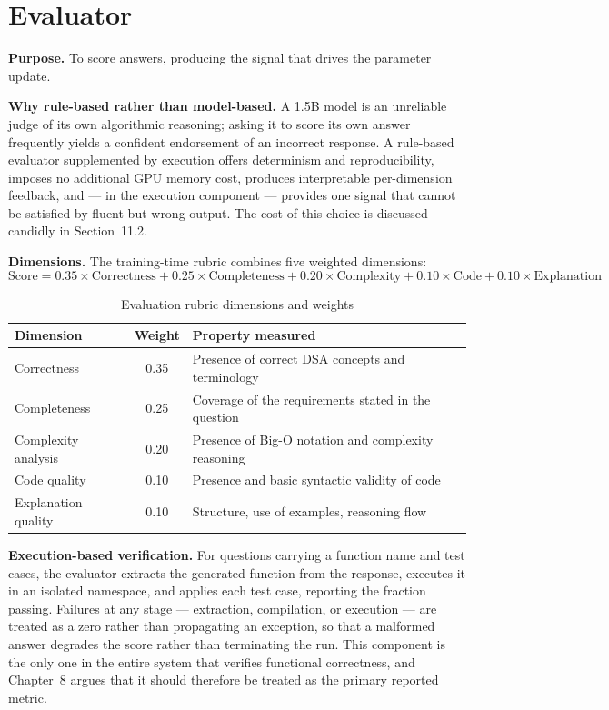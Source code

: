 \documentclass[12pt,a4paper]{report}
\begin{document}
\section{Evaluator}

\textbf{Purpose.} To score answers, producing the signal that drives the parameter update.

\textbf{Why rule-based rather than model-based.} A 1.5B model is an unreliable judge of its own algorithmic reasoning; asking it to score its own answer frequently yields a confident endorsement of an incorrect response. A rule-based evaluator supplemented by execution offers determinism and reproducibility, imposes no additional GPU memory cost, produces interpretable per-dimension feedback, and --- in the execution component --- provides one signal that cannot be satisfied by fluent but wrong output. The cost of this choice is discussed candidly in Section~11.2.

\textbf{Dimensions.} The training-time rubric combines five weighted dimensions:
\begin{equation}
\text{Score} = 0.35 \times \text{Correctness} + 0.25 \times \text{Completeness} + 0.20 \times \text{Complexity} + 0.10 \times \text{Code} + 0.10 \times \text{Explanation}
\end{equation}

\begin{table}[htbp]
\centering
\caption{Evaluation rubric dimensions and weights}
\begin{tabular}{>{\raggedright\arraybackslash}p{3cm} c p{6cm}}
\toprule
\textbf{Dimension} & \textbf{Weight} & \textbf{Property measured} \\
\midrule
Correctness & 0.35 & Presence of correct DSA concepts and terminology \\
Completeness & 0.25 & Coverage of the requirements stated in the question \\
Complexity analysis & 0.20 & Presence of Big-O notation and complexity reasoning \\
Code quality & 0.10 & Presence and basic syntactic validity of code \\
Explanation quality & 0.10 & Structure, use of examples, reasoning flow \\
\bottomrule
\end{tabular}
\end{table}

\textbf{Execution-based verification.} For questions carrying a function name and test cases, the evaluator extracts the generated function from the response, executes it in an isolated namespace, and applies each test case, reporting the fraction passing. Failures at any stage --- extraction, compilation, or execution --- are treated as a zero rather than propagating an exception, so that a malformed answer degrades the score rather than terminating the run. This component is the only one in the entire system that verifies functional correctness, and Chapter~8 argues that it should therefore be treated as the primary reported metric.
\end{document}
